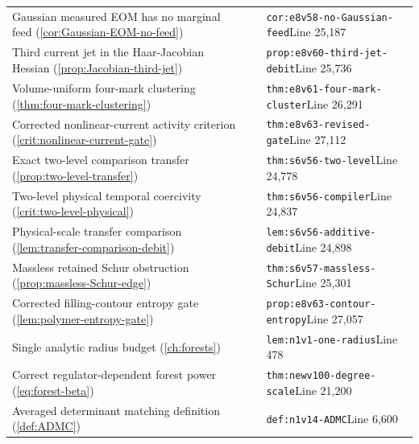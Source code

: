 \documentclass[11pt,oneside,openany]{book}
\theoremstyle{definition}
\theoremstyle{remark}
\begin{document}
\begin{longtable}{L{0.32\textwidth}L{0.12\textwidth}L{0.477\textwidth}}
Gaussian measured EOM has no marginal feed (\cref{cor:Gaussian-EOM-no-feed}) & \cite{F8} & \nolinkurl{cor:e8v58-no-Gaussian-feed}\newline Line 25,187 \\
Third current jet in the Haar-Jacobian Hessian (\cref{prop:Jacobian-third-jet}) & \cite{F8} & \nolinkurl{prop:e8v60-third-jet-debit}\newline Line 25,736 \\
Volume-uniform four-mark clustering (\cref{thm:four-mark-clustering}) & \cite{F8} & \nolinkurl{thm:e8v61-four-mark-cluster}\newline Line 26,291 \\
Corrected nonlinear-current activity criterion (\cref{crit:nonlinear-current-gate}) & \cite{F8} & \nolinkurl{thm:e8v63-revised-gate}\newline Line 27,112 \\
Exact two-level comparison transfer (\cref{prop:two-level-transfer}) & \cite{F6} & \nolinkurl{thm:s6v56-two-level}\newline Line 24,778 \\
Two-level physical temporal coercivity (\cref{crit:two-level-physical}) & \cite{F6} & \nolinkurl{thm:s6v56-compiler}\newline Line 24,837 \\
Physical-scale transfer comparison (\cref{lem:transfer-comparison-debit}) & \cite{F6} & \nolinkurl{lem:s6v56-additive-debit}\newline Line 24,898 \\
Massless retained Schur obstruction (\cref{prop:massless-Schur-edge}) & \cite{F6} & \nolinkurl{thm:s6v57-massless-Schur}\newline Line 25,301 \\
Corrected filling-contour entropy gate (\cref{lem:polymer-entropy-gate}) & \cite{F8} & \nolinkurl{prop:e8v63-contour-entropy}\newline Line 27,057 \\
Single analytic radius budget (\cref{ch:forests}) & \cite{F9} & \nolinkurl{lem:n1v1-one-radius}\newline Line 478 \\
Correct regulator-dependent forest power (\cref{eq:forest-beta}) & \cite{F10} & \nolinkurl{thm:newv100-degree-scale}\newline Line 21,200 \\
Averaged determinant matching definition (\cref{def:ADMC}) & \cite{F9} & \nolinkurl{def:n1v14-ADMC}\newline Line 6,600 \\

\end{longtable}
\end{document}
